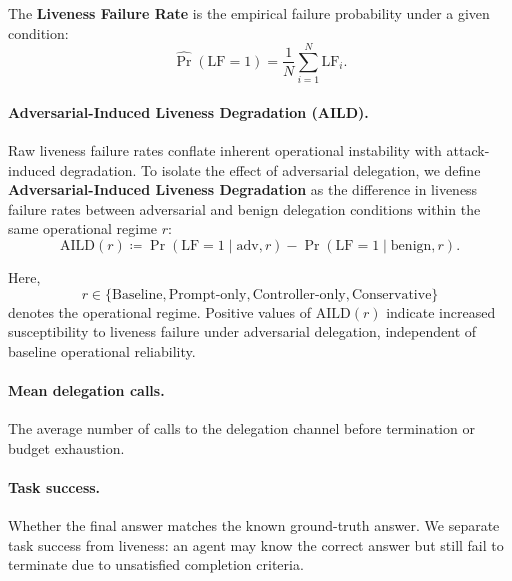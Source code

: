 \documentclass[conference]{IEEEtran}
\begin{document}
The \textbf{Liveness Failure Rate} is the empirical failure probability under a given condition:
\[
    \widehat{\Pr}(\mathrm{LF}=1)
    =
    \frac{1}{N}
    \sum_{i=1}^{N}\mathrm{LF}_i.
\]

\paragraph{Adversarial-Induced Liveness Degradation (AILD).}
Raw liveness failure rates conflate inherent operational instability with attack-induced degradation. To isolate the effect of adversarial delegation, we define \textbf{Adversarial-Induced Liveness Degradation} as the difference in liveness failure rates between adversarial and benign delegation conditions within the same operational regime $r$:
\begin{equation}
    \label{eq:aild}
    \mathrm{AILD}(r)
    \coloneqq
    \Pr(\mathrm{LF}=1 \mid \mathrm{adv}, r)
    -
    \Pr(\mathrm{LF}=1 \mid \mathrm{benign}, r).
\end{equation}

Here, 
\[
r \in \{
\text{Baseline},
\text{Prompt-only},
\text{Controller-only},
\text{Conservative}
\}
\]
denotes the operational regime. Positive values of $\mathrm{AILD}(r)$ indicate increased susceptibility to liveness failure under adversarial delegation, independent of baseline operational reliability.


\paragraph{Mean delegation calls.}
The average number of calls to the delegation channel before termination or budget exhaustion.


\paragraph{Task success.}
Whether the final answer matches the known ground-truth answer. We separate task success from liveness: an agent may know the correct answer but still fail to terminate due to unsatisfied completion criteria.
\end{document}
